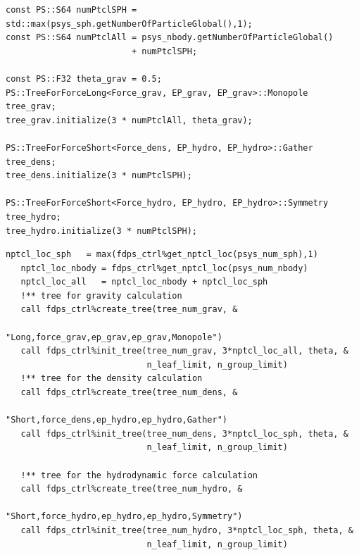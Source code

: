 \ifCpp %
\begin{lstlisting}[caption=Creation and initialization of \textsf{TreeForForce} objects]
const PS::S64 numPtclSPH = std::max(psys_sph.getNumberOfParticleGlobal(),1);
const PS::S64 numPtclAll = psys_nbody.getNumberOfParticleGlobal()
                         + numPtclSPH;

const PS::F32 theta_grav = 0.5;
PS::TreeForForceLong<Force_grav, EP_grav, EP_grav>::Monopole tree_grav;
tree_grav.initialize(3 * numPtclAll, theta_grav);

PS::TreeForForceShort<Force_dens, EP_hydro, EP_hydro>::Gather tree_dens;
tree_dens.initialize(3 * numPtclSPH);

PS::TreeForForceShort<Force_hydro, EP_hydro, EP_hydro>::Symmetry tree_hydro;
tree_hydro.initialize(3 * numPtclSPH);
\end{lstlisting}
\endifCpp
\ifFtn %
\begin{lstlisting}[caption=Creation and initialization of \textsf{TreeForForce} objects]
   nptcl_loc_sph   = max(fdps_ctrl%get_nptcl_loc(psys_num_sph),1)
   nptcl_loc_nbody = fdps_ctrl%get_nptcl_loc(psys_num_nbody)
   nptcl_loc_all   = nptcl_loc_nbody + nptcl_loc_sph
   !** tree for gravity calculation
   call fdps_ctrl%create_tree(tree_num_grav, &
                              "Long,force_grav,ep_grav,ep_grav,Monopole")
   call fdps_ctrl%init_tree(tree_num_grav, 3*nptcl_loc_all, theta, &
                            n_leaf_limit, n_group_limit)
   !** tree for the density calculation
   call fdps_ctrl%create_tree(tree_num_dens, &
                              "Short,force_dens,ep_hydro,ep_hydro,Gather")
   call fdps_ctrl%init_tree(tree_num_dens, 3*nptcl_loc_sph, theta, &
                            n_leaf_limit, n_group_limit)

   !** tree for the hydrodynamic force calculation
   call fdps_ctrl%create_tree(tree_num_hydro, &
                              "Short,force_hydro,ep_hydro,ep_hydro,Symmetry")
   call fdps_ctrl%init_tree(tree_num_hydro, 3*nptcl_loc_sph, theta, &
                            n_leaf_limit, n_group_limit)
\end{lstlisting}
\endifFtn
\ifC %
